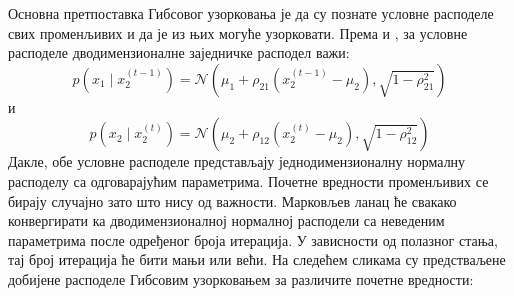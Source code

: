 Основна претпоставка Гибсовог узорковања је да су познате условне расподеле свих променљивих и да је из њих могуће узорковати. Према \cite{verov7} и \cite{verov8}, за условне расподеле дводимензионалне заједничке расподел важи:
$$
p(x_1 \mid x_2^{(t-1)}) = \mathcal{N}(\mu_1 + \rho_{21}(x_2^{(t-1)} - \mu_2),\sqrt{1-\rho_{21}^2})
$$
и
$$
p(x_2 \mid x_2^{(t)}) = \mathcal{N}(\mu_2 + \rho_{12}(x_2^{(t)} - \mu_2),\sqrt{1-\rho_{12}^2})
$$
Дакле, обе условне расподеле представљају једнодимензионалну нормалну расподелу са одговарајућим параметрима.
Почетне вредности променљивих се бирају случајно зато што нису од важности. Марковљев ланац ће свакако конвергирати ка дводимензионалној нормалној расподели са неведеним параметрима после одређеног броја итерација. У зависности од полазног стања, тај број итерација ће бити мањи или већи. На следећем
 сликама су предстваљене добијене расподеле Гибсовим узорковањем за различите почетне вредности:

